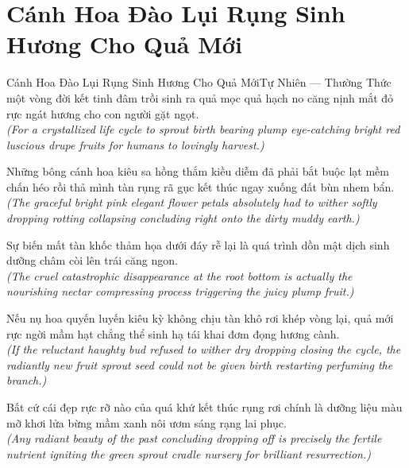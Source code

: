 \section{Cánh Hoa Đào Lụi Rụng Sinh Hương Cho Quả Mới}
\begin{truyen}{Cánh Hoa Đào Lụi Rụng Sinh Hương Cho Quả Mới}{Tự Nhiên --- Thường Thức}
 một vòng đời kết tinh đâm trồi sinh ra quả mọc quả hạch no căng nịnh mắt đỏ rực ngát hương cho con người gặt ngọt.\\[4pt]
\textit{(For a crystallized life cycle to sprout birth bearing plump eye-catching bright red luscious drupe fruits for humans to lovingly harvest.)}

Những bông cánh hoa kiêu sa hồng thắm kiều diễm đã phải bắt buộc lạt mềm chấn héo rồi thả mình tàn rụng rã gục kết thúc ngay xuống đất bùn nhem bẩn.\\[4pt]
\textit{(The graceful bright pink elegant flower petals absolutely had to wither softly dropping rotting collapsing concluding right onto the dirty muddy earth.)}

Sự biến mất tàn khốc thảm họa dưới đáy rễ lại là quá trình dồn mật dịch sinh dưỡng châm còi lên trái căng ngon.\\[4pt]
\textit{(The cruel catastrophic disappearance at the root bottom is actually the nourishing nectar compressing process triggering the juicy plump fruit.)}

Nếu nụ hoa quyến luyến kiêu kỳ không chịu tàn khô rơi khép vòng lại, quả mới rực ngời mầm hạt chẳng thể sinh hạ tái khai đơm đọng hương cành.\\[4pt]
\textit{(If the reluctant haughty bud refused to wither dry dropping closing the cycle, the radiantly new fruit sprout seed could not be given birth restarting perfuming the branch.)}

\end{truyen}
\begin{baihoc}
  Bất cứ cái đẹp rực rỡ nào của quá khứ kết thúc rụng rơi chính là dưỡng liệu màu mỡ khơi lửa bừng mầm xanh nôi ươm sáng rạng lai phục.\\[4pt]
  \textit{(Any radiant beauty of the past concluding dropping off is precisely the fertile nutrient igniting the green sprout cradle nursery for brilliant resurrection.)}
\end{baihoc}
